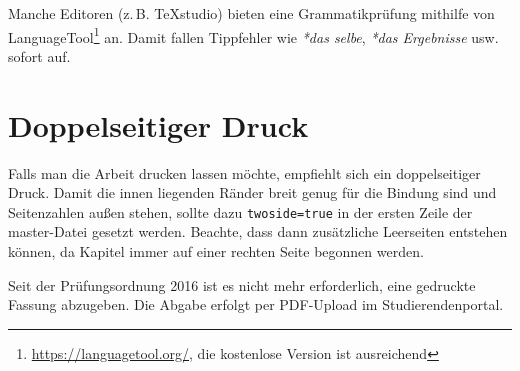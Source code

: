Manche Editoren (z.\,B. TeXstudio) bieten eine Grammatikprüfung mithilfe von LanguageTool\footnote{\url{https://languagetool.org/}, die kostenlose Version ist ausreichend} an.
Damit fallen Tippfehler wie \emph{*das selbe}, \emph{*das Ergebnisse} usw. sofort auf.

\section{Doppelseitiger Druck}

Falls man die Arbeit drucken lassen möchte, empfiehlt sich ein doppelseitiger Druck.
Damit die innen liegenden Ränder breit genug für die Bindung sind und Seitenzahlen außen stehen, sollte dazu \verb|twoside=true| in der ersten Zeile der master-Datei gesetzt werden.
Beachte, dass dann zusätzliche Leerseiten entstehen können, da Kapitel immer auf einer rechten Seite begonnen werden.

Seit der Prüfungsordnung 2016 ist es nicht mehr erforderlich, eine gedruckte Fassung abzugeben.
Die Abgabe erfolgt per PDF-Upload im Studierendenportal.
